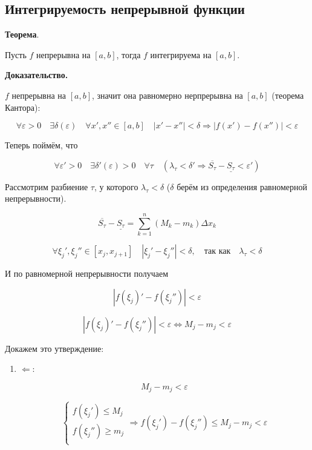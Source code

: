 \documentclass[a4paper]{article}
\begin{document}
\begin{definit}
\subsection*{Интегрируемость непрерывной функции}

\begin{htheorem}\textbf{Теорема}.

Пусть $f$ непрерывна на $[a,b]$, тогда $f$ интегрируема на $[a,b]$.
\end{htheorem}

\begin{hproof}\textbf{Доказательство.}

$f$ непрерывна на $[a,b]$, значит она равномерно нерпрерывна на $[a,b]$ (теорема Кантора):

\[
\forall \varepsilon > 0 \quad \exists \delta ( \varepsilon ) \quad \forall x', x'' \in [a,b] \quad |x'-x''| < \delta \Rightarrow |f(x') - f(x'')| < \varepsilon
\]

Теперь поймём, что 

\[
\forall \varepsilon' > 0 \quad \exists \delta'(\varepsilon) > 0 \quad \forall \tau \quad (\lambda_\tau < \delta' \Rightarrow \overline{S_\tau} - \underline{S_\tau} < \varepsilon')
\]

Рассмотрим разбиение $\tau$, у которого $\lambda_\tau < \delta$ ($\delta$ берём из определения равномерной непрерывности).

\[
\overline{S_\tau} - \underline{S_\tau} = \sum_{k=1}^n (M_k-m_k) \Delta x_k
\]

\[
\forall \xi_j', \xi_j'' \in [x_j, x_{j+1}] \quad |\xi_j' - \xi_j''| < \delta, \quad \text{так как} \quad \lambda_\tau < \delta
\]

И по равномерной непрерывности получаем

\[
|f(\xi_j)' - f(\xi_j'')| < \varepsilon
\]

\[
|f(\xi_j)' - f(\xi_j'')| < \varepsilon \Leftrightarrow M_j - m_j < \varepsilon
\]

Докажем это утверждение:
\begin{enumerate}
\item $\Leftarrow$:

\[
M_j - m_j < \varepsilon
\]

\[
\begin{cases}
f(\xi_j') \leq M_j \\
f(\xi_j'') \geq m_j \\
\end{cases}
\Rightarrow f(\xi_j') - f(\xi_j'') \leq M_j-m_j < \varepsilon
\]


\end{enumerate}
\end{hproof}
\end{definit}
\end{document}
